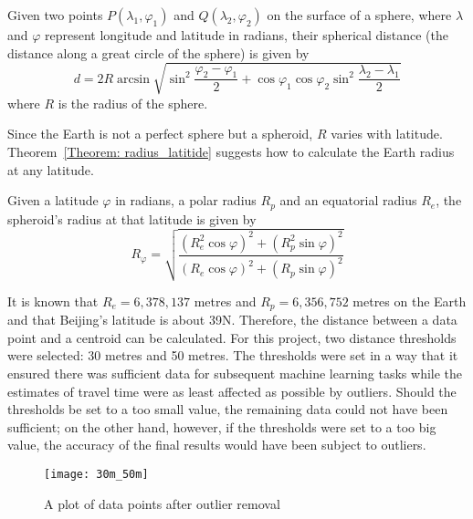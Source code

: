 \begin{theorem}\label{Theorem: haversine}
Given two points $P(\lambda_1,\varphi_1)$ and $Q(\lambda_2,\varphi_2)$ on the surface of a sphere, where $\lambda$ and $\varphi$ represent longitude and latitude in radians, their spherical distance (the distance along a great circle of the sphere) is given by \cite{FI06}
\begin{equation}
d = 2R\arcsin{\sqrt{\sin^2\frac{\varphi_2 - \varphi_1}{2} + \cos\varphi_1\cos\varphi_2\sin^2\frac{\lambda_2 - \lambda_1}{2}}} 
\end{equation}
where $R$ is the radius of the sphere. 
\end{theorem}

Since the Earth is not a perfect sphere but a spheroid, $R$ varies with latitude. Theorem~\ref{Theorem: radius_latitide} suggests how to calculate the Earth radius at any latitude. 

\begin{theorem}\label{Theorem: radius_latitide}
Given a latitude $\varphi$ in radians, a polar radius $R_{p}$ and an equatorial radius $R_{e}$, the spheroid's radius at that latitude is given by \cite{EAR17}
\begin{equation}
R_{\varphi} = \sqrt{\frac{(R_{e}^2\cos\varphi)^2 + (R_{p}^2\sin\varphi)^2}{(R_{e}\cos\varphi)^2 + (R_{p}\sin\varphi)^2}}
\end{equation}
\end{theorem}

It is known that $R_{e} = 6,378,137$ metres and $R_{p} = 6,356,752$ metres on the Earth \cite{NASA16} and that Beijing's latitude is about 39\textdegree N. Therefore, the distance between a data point and a centroid can be calculated. For this project, two distance thresholds were selected: 30 metres and 50 metres. The thresholds were set in a way that it ensured there was sufficient data for subsequent machine learning tasks while the estimates of travel time were as least affected as possible by outliers. Should the thresholds be set to a too small value, the remaining data could not have been sufficient; on the other hand, however, if the thresholds were set to a too big value, the accuracy of the final results would have been subject to outliers. 

\begin{figure}[h]
\texttt{[image: 30m\_50m]}
\centering
\caption{A plot of data points after outlier removal}\label{Fig:after_removal}
\end{figure}

